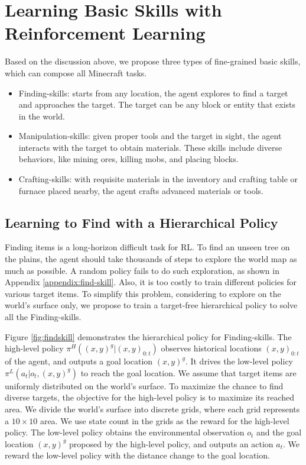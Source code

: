 \documentclass{article}
\begin{document}
\section{Learning Basic Skills with Reinforcement Learning}
Based on the discussion above, we propose three types of fine-grained basic skills, which can compose all Minecraft tasks.
\begin{itemize}
    \item Finding-skills: starts from any location, the agent explores to find a target and approaches the target. The target can be any block or entity that exists in the world.
    \item Manipulation-skills: given proper tools and the target in sight, the agent interacts with the target to obtain materials. These skills include diverse behaviors, like mining ores, killing mobs, and placing blocks.
    \item Crafting-skills: with requisite materials in the inventory and crafting table or furnace placed nearby, the agent crafts advanced materials or tools.
\end{itemize}


\subsection{Learning to Find with a Hierarchical Policy}
Finding items is a long-horizon difficult task for RL. To find an unseen tree on the plains, the agent should take thousands of steps to explore the world map as much as possible. A random policy fails to do such exploration, as shown in Appendix \ref{appendix:find-skill}.
Also, it is too costly to train different policies for various target items. To simplify this problem, considering to explore on the world's surface only, we propose to train a target-free hierarchical policy to solve all the Finding-skills. 


Figure \ref{fig:findskill} demonstrates the hierarchical policy for Finding-skills.
The high-level policy $\pi^H\left((x,y)^g | (x,y)_{0:t}\right)$ observes historical locations $(x,y)_{0:t}$ of the agent, and outputs a goal location $(x,y)^g$. It drives the low-level policy $\pi^L\left(a_t|o_t,(x,y)^g\right)$ to reach the goal location. We assume that target items are uniformly distributed on the world's surface. To maximize the chance to find diverse targets, the objective for the high-level policy is to maximize its reached area. We divide the world's surface into discrete grids, where each grid represents a $10\times 10$ area. We use state count in the grids as the reward for the high-level policy. The low-level policy obtains the environmental observation $o_t$ and the goal location $(x,y)^g$ proposed by the high-level policy, and outputs an action $a_t$. We reward the low-level policy with the distance change to the goal location. 
\end{document}
